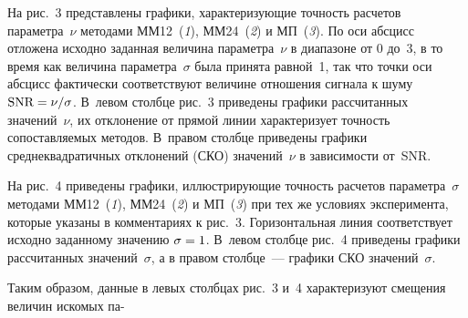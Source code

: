 \begin{multicols}{2}
     На рис.~3 представлены графики, характеризующие точность расчетов
параметра~$\nu$ методами ММ12~(\textit{1}), ММ24~(\textit{2}) и
МП~(\textit{3}). По оси абсцисс отложена исходно заданная величина
параметра~$\nu$ в диапазоне от 0 до~3, в то время как величина параметра~$\sigma$ была
принята равной~1, так что точки оси абсцисс фактически соответствуют величине
отношения сигнала к шуму $\mbox{SNR}\hm=\nu/\sigma$. В~левом столбце рис.~3 приведены
графики рассчитанных значений~$\nu$, их отклонение от прямой линии характеризует
точность сопоставляемых методов. В~правом столбце приведены графики
среднеквадратичных отклонений (СКО) значений~$\nu$ в зависимости от~SNR.


     На рис.~4 приведены графики, иллюстрирующие точность расчетов
параметра~$\sigma$ методами ММ12~(\textit{1}), ММ24~(\textit{2})
и МП~(\textit{3}) при тех же условиях эксперимента, которые указаны в
комментариях к рис.~3. Горизонтальная линия соответствует исходно заданному
значению $\sigma\hm=1$. В~левом столбце рис.~4 приведены графики рассчитанных
значений~$\sigma$, а в правом столбце~--- графики СКО
значений~$\sigma$.



     Таким образом, данные в левых столбцах рис.~3 и~4 характеризуют смещения
величин искомых па-\linebreak\vspace*{-12pt}

\pagebreak

\end{multicols}

     \begin{figure} %
     \vspace*{1pt}
\begin{center}
\mbox{%
\epsfxsize=147mm
}
\end{center}
\vspace*{-9pt}
     \end{figure}


